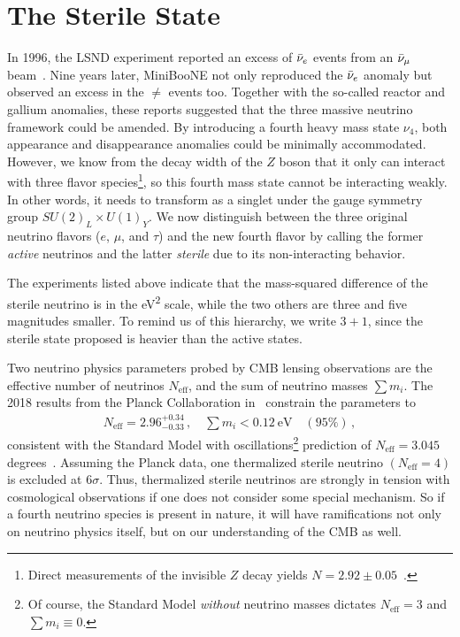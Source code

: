 %
%
\section{The Sterile State}\label{sec:anomalies}
In 1996, the LSND experiment reported an excess of $\bar{\nu}_e$ events from an $\bar{\nu}_\mu$ beam~\cite{lsnd}.  
Nine years later, MiniBooNE not only reproduced the $\bar{\nu}_e$ anomaly but observed an excess in the
$\ne$ events too. Together with the so-called reactor and gallium anomalies, these reports suggested 
that the three massive neutrino framework could be amended.
By introducing a fourth heavy mass state $\nu_4$, both appearance and disappearance anomalies could be minimally accommodated.
However, we know from the decay width of the $Z$ boson that it only can interact with three flavor species\footnote{
    Direct measurements of the invisible $Z$ decay yields $N=2.92 \pm 0.05$~\cite{pdg}.
}, 
so this fourth mass state cannot be interacting weakly. In other words, it needs to transform as a
singlet under the gauge symmetry group $SU(2)_L \times U(1)_{Y}$.
We now distinguish between the three original neutrino flavors ($e$, $\mu$, and $\tau$) and the new fourth 
flavor by calling the former \emph{active} neutrinos
and the latter \emph{sterile} due to its non-interacting behavior.

The experiments listed above indicate that the mass-squared difference of the 
sterile neutrino is in the \si{\eV\squared} scale, while the two others
are three and five magnitudes smaller. To remind us of this hierarchy, we write $3+1$, since the sterile state 
proposed is heavier than the active states.


Two neutrino physics parameters probed by CMB lensing observations are the effective number of neutrinos
$N_\text{eff}$, and the sum of neutrino masses $\sum m_i$. 
The 2018 results from the Planck Collaboration in~\cite{planck2018} constrain the parameters to 
\begin{align}
    N_\text{eff} = 2.96^{+0.34}_{-0.33}\,, \quad \sum m_i < \SI{0.12}{\eV} \quad (95\%)\,,
\end{align}
consistent with the Standard Model with oscillations\footnote{Of course, the 
Standard Model \emph{without} neutrino masses dictates $N_\text{eff} = 3$ and $\sum m_i \equiv 0$.} prediction of $N_\text{eff} = 3.045$ degrees~\cite{desalas2016}.
Assuming the Planck data, one thermalized sterile neutrino $(N_\text{eff} = 4)$ is excluded at $6\sigma$. 
Thus, thermalized sterile 
neutrinos are strongly in tension with cosmological observations if one does not consider some special mechanism.
So if a fourth neutrino species is present in nature, it will have ramifications not only on neutrino physics itself, but on
our understanding of the CMB as well.


